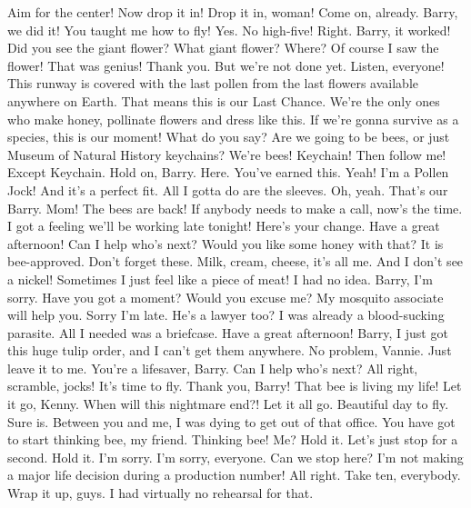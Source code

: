 \documentclass[a4paper,12pt]{article}
\begin{document}
Aim for the center!
Now drop it in! Drop it in, woman!
Come on, already.
Barry, we did it! You taught me how to fly!
Yes. No high-five!
Right.
Barry, it worked!
Did you see the giant flower?
What giant flower? Where? Of course
I saw the flower! That was genius!
Thank you.
But we're not done yet.
Listen, everyone!
This runway is covered with the last pollen from the last flowers available anywhere on Earth.
That means this is our Last Chance. We're the only ones who make honey, pollinate flowers and dress like this.
If we're gonna survive as a species, this is our moment! What do you say?
Are we going to be bees, or just Museum of Natural History keychains?
We're bees!
Keychain!
Then follow me! Except Keychain.
Hold on, Barry. Here. You've earned this.
Yeah!
I'm a Pollen Jock! And it's a perfect fit. All I gotta do are the sleeves.
Oh, yeah.
That's our Barry.
Mom! The bees are back!
If anybody needs to make a call, now's the time. I got a feeling we'll be working late tonight!
Here's your change. Have a great afternoon! Can I help who's next?
Would you like some honey with that?
It is bee-approved. Don't forget these.
Milk, cream, cheese, it's all me.  And I don't see a nickel!
Sometimes I just feel like a piece of meat!
I had no idea.
Barry, I'm sorry.
Have you got a moment?
Would you excuse me?
My mosquito associate will help you.
Sorry I'm late.
He's a lawyer too?
I was already a blood-sucking parasite. All I needed was a briefcase.
Have a great afternoon!
Barry, I just got this huge tulip order, and I can't get them anywhere.
No problem, Vannie. Just leave it to me.
You're a lifesaver, Barry. Can I help who's next?
All right, scramble, jocks! It's time to fly.
Thank you, Barry!
That bee is living my life!
Let it go, Kenny.
When will this nightmare end?!
Let it all go.
Beautiful day to fly.
Sure is.
Between you and me,
I was dying to get out of that office.
You have got to start thinking bee, my friend.
Thinking bee!
Me?
Hold it. Let's just stop for a second. Hold it.
I'm sorry. I'm sorry, everyone. Can we stop here?
I'm not making a major life decision during a production number!
All right. Take ten, everybody. Wrap it up, guys.
I had virtually no rehearsal for that.
\fi
\end{document}
